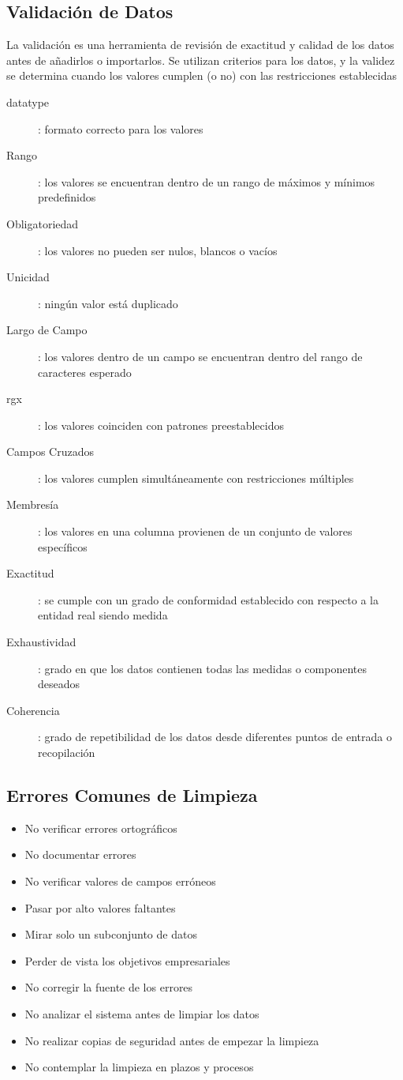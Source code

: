 \subsection{Validación de Datos}
La validación es una herramienta de revisión de exactitud y calidad de los datos antes de añadirlos o importarlos. Se utilizan criterios para los datos, y la validez se determina cuando los valores cumplen (o no) con las restricciones establecidas
\begin{description}
    \item [\gls{datatype}]{ : formato correcto para los valores}
    \item [Rango]{ : los valores se encuentran dentro de un rango de máximos y mínimos predefinidos}
    \item [Obligatoriedad]{ : los valores no pueden ser nulos, blancos o vacíos}
    \item [Unicidad]{ : ningún valor está duplicado}
    \item [Largo de Campo]{ : los valores dentro de un campo se encuentran dentro del rango de caracteres esperado}
    \item [\gls{rgx}]{ : los valores coinciden con patrones preestablecidos}
    \item [Campos Cruzados]{ : los valores cumplen simultáneamente con restricciones múltiples}
    \item [Membresía]{ : los valores en una columna provienen de un conjunto de valores específicos} 
    \item [Exactitud]{ : se cumple con un grado de conformidad establecido con respecto a la entidad real siendo medida}
    \item [Exhaustividad]{ : grado en que los datos contienen todas las medidas o componentes deseados}
    \item [Coherencia]{ : grado de repetibilidad de los datos desde diferentes puntos de entrada o recopilación}
\end{description}

\subsection{Errores Comunes de Limpieza}
\begin{itemize}
    \item {No verificar errores ortográficos}
    \item {No documentar errores}
    \item {No verificar valores de campos erróneos}
    \item {Pasar por alto valores faltantes}
    \item {Mirar solo un subconjunto de datos}
    \item {Perder de vista los objetivos empresariales}
    \item {No corregir la fuente de los errores}
    \item {No analizar el sistema antes de limpiar los datos}
    \item {No realizar copias de seguridad antes de empezar la limpieza}
    \item {No contemplar la limpieza en plazos y procesos}
\end{itemize}

\newpage